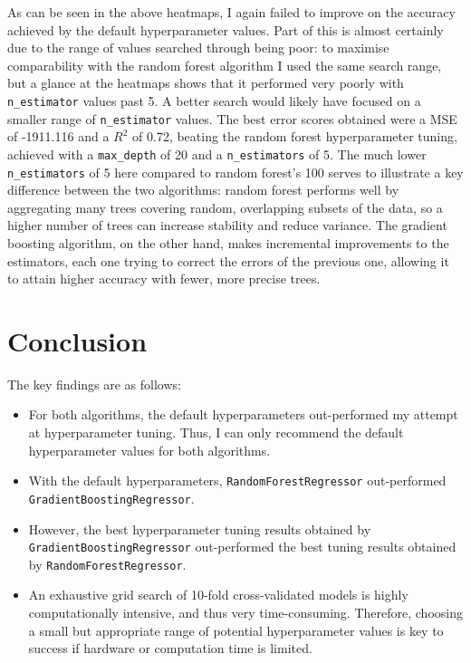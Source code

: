 \documentclass[a4paper]{article}
\begin{document}
As can be seen in the above heatmaps, I again failed to improve on the accuracy achieved by the default hyperparameter values.
Part of this is almost certainly due to the range of values searched through being poor: to maximise comparability with the random forest algorithm I used the same search range, but a glance at the heatmaps shows that it performed very poorly with \texttt{n_estimator} values past 5.
A better search would likely have focused on a smaller range of \texttt{n_estimator} values.
The best error scores obtained were a MSE of -1911.116 and a $R^2$ of 0.72, beating the random forest hyperparameter tuning, achieved with a \texttt{max_depth} of 20 and a \texttt{n_estimators} of 5.
The much lower \texttt{n_estimators} of 5 here compared to random forest's 100 serves to illustrate a key difference between the two algorithms: random forest performs well by aggregating many trees covering random, overlapping subsets of the data, so a higher number of trees can increase stability and reduce variance.
The gradient boosting algorithm, on the other hand, makes incremental improvements to the estimators, each one trying to correct the errors of the previous one, allowing it to attain higher accuracy with fewer, more precise trees.

\section{Conclusion}
The key findings are as follows:
\begin{itemize}
    \item   For both algorithms, the default hyperparameters out-performed my attempt at hyperparameter tuning.
            Thus, I can only recommend the default hyperparameter values for both algorithms.
    \item   With the default hyperparameters, \texttt{RandomForestRegressor} out-performed \texttt{GradientBoostingRegressor}.
    \item   However, the best hyperparameter tuning results obtained by \texttt{GradientBoostingRegressor} out-performed the best tuning results obtained by \texttt{RandomForestRegressor}.
    \item   An exhaustive grid search of 10-fold cross-validated models is highly computationally intensive, and thus very time-consuming.
            Therefore, choosing a small but appropriate range of potential hyperparameter values is key to success if hardware or computation time is limited.
\end{itemize}



\nocite{*}
\printbibliography
\end{document}
